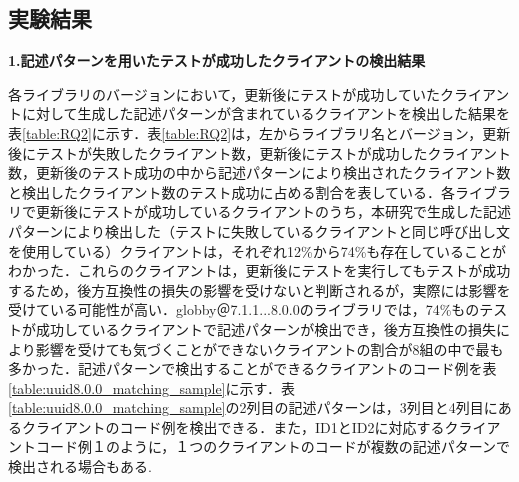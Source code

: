 \documentclass[11pt]{jreport}
\begin{document}
\begin{table}[t]
    \caption{検出したテストが成功していたクライアントのテスト内容}
    \label{table:RQ2_test}
    \centering
\end{table}
\subsection{実験結果}
\noindent\textbf{1.記述パターンを用いたテストが成功したクライアントの検出結果}

各ライブラリのバージョンにおいて，更新後にテストが成功していたクライアントに対して生成した記述パターンが含まれているクライアントを検出した結果を表\ref{table:RQ2}に示す．表\ref{table:RQ2}は，左からライブラリ名とバージョン，更新後にテストが失敗したクライアント数，更新後にテストが成功したクライアント数，更新後のテスト成功の中から記述パターンにより検出されたクライアント数と検出したクライアント数のテスト成功に占める割合を表している．各ライブラリで更新後にテストが成功しているクライアントのうち，本研究で生成した記述パターンにより検出した（テストに失敗しているクライアントと同じ呼び出し文を使用している）クライアントは，それぞれ12\%から74\%も存在していることがわかった．これらのクライアントは，更新後にテストを実行してもテストが成功するため，後方互換性の損失の影響を受けないと判断されるが，実際には影響を受けている可能性が高い．globby＠7.1.1...8.0.0のライブラリでは，74\%ものテストが成功しているクライアントで記述パターンが検出でき，後方互換性の損失により影響を受けても気づくことができないクライアントの割合が8組の中で最も多かった．記述パターンで検出することができるクライアントのコード例を表\ref{table:uuid8.0.0_matching_sample}に示す．表\ref{table:uuid8.0.0_matching_sample}の2列目の記述パターンは，3列目と4列目にあるクライアントのコード例を検出できる．また，ID1とID2に対応するクライアントコード例１のように，１つのクライアントのコードが複数の記述パターンで検出される場合もある.
\end{document}
